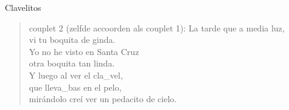 \begin{song}{Clavelitos}
\begin{verse}{couplet 2 (zelfde accoorden als couplet 1):}
La tarde que a media luz,\\
vi tu boquita de ginda.\\
Yo no he visto en Santa Cruz\\
otra boquita tan linda. \hspace{1em} \hspace{1em} \hspace{1em}\\
Y luego al ver el cla\_vel,\\
\hspace{1em} que lleva\_bas  \hspace{1em} en el pelo, \hspace{1em} \hspace{1em} \hspace{1em}\\
mirándolo creí  ver
un pedacito de cielo.
\end{verse}
\end{song}